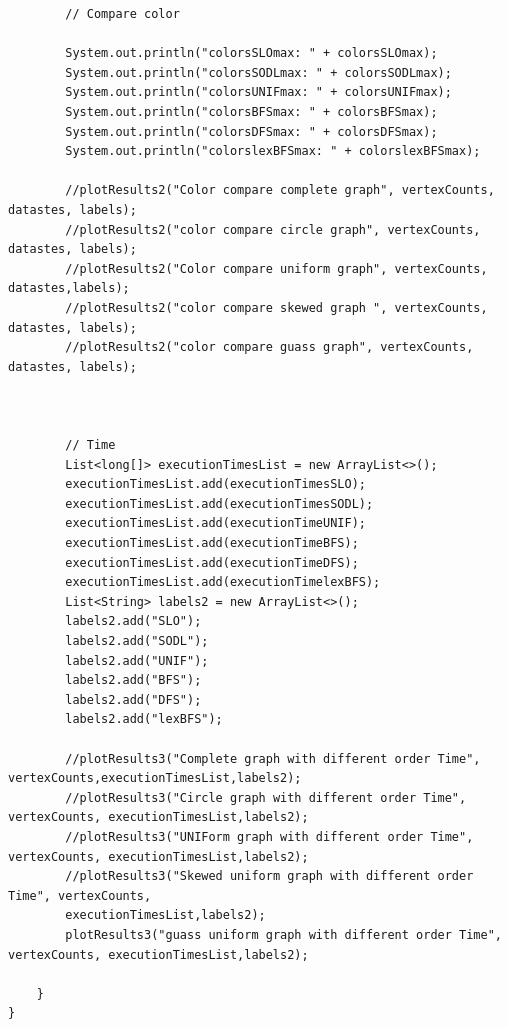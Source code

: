 \documentclass{article}
\begin{document}
\begin{verbatim}
        // Compare color

        System.out.println("colorsSLOmax: " + colorsSLOmax);
        System.out.println("colorsSODLmax: " + colorsSODLmax);
        System.out.println("colorsUNIFmax: " + colorsUNIFmax);
        System.out.println("colorsBFSmax: " + colorsBFSmax);
        System.out.println("colorsDFSmax: " + colorsDFSmax);
        System.out.println("colorslexBFSmax: " + colorslexBFSmax);

        //plotResults2("Color compare complete graph", vertexCounts, datastes, labels);
        //plotResults2("color compare circle graph", vertexCounts, datastes, labels);
        //plotResults2("Color compare uniform graph", vertexCounts, datastes,labels);
        //plotResults2("color compare skewed graph ", vertexCounts, datastes, labels);
        //plotResults2("color compare guass graph", vertexCounts, datastes, labels);



        // Time
        List<long[]> executionTimesList = new ArrayList<>();
        executionTimesList.add(executionTimesSLO);
        executionTimesList.add(executionTimesSODL);
        executionTimesList.add(executionTimeUNIF);
        executionTimesList.add(executionTimeBFS);
        executionTimesList.add(executionTimeDFS);
        executionTimesList.add(executionTimelexBFS);
        List<String> labels2 = new ArrayList<>();
        labels2.add("SLO");
        labels2.add("SODL");
        labels2.add("UNIF");
        labels2.add("BFS");
        labels2.add("DFS");
        labels2.add("lexBFS");

        //plotResults3("Complete graph with different order Time", vertexCounts,executionTimesList,labels2);
        //plotResults3("Circle graph with different order Time", vertexCounts, executionTimesList,labels2);
        //plotResults3("UNIForm graph with different order Time", vertexCounts, executionTimesList,labels2);
        //plotResults3("Skewed uniform graph with different order Time", vertexCounts,
        executionTimesList,labels2);
        plotResults3("guass uniform graph with different order Time", vertexCounts, executionTimesList,labels2);

    }
}


\end{verbatim}
\printbibliography %
\end{document}
